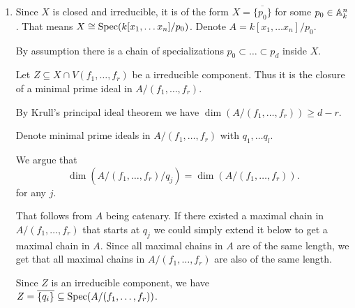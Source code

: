 \newcommand{\sheet}{10}




\maketitle{}

\begin{exercise}{1}
    \begin{enumerate}
        \item{
                Since $X$ is closed and irreducible, it is of the form $X =
                \overline{\{p_0\}}$ for some $p_0 \in \mathbb{A}^n_k$.
                That means $X \cong \operatorname{Spec}(k[x_1, \dots x_n] / p_0)$.
                Denote $A = k[x_1, \dots x_n] / p_0$.

                By assumption there is a chain of specializations $p_0 \subset
                \dots \subset p_d$ inside $X$.

                Let $Z \subseteq X \cap V(f_1, \dots, f_r)$ be a irreducible
                component. Thus it is the closure of a minimal prime ideal in $A
                / (f_1, \dots, f_r)$.

                By Krull's principal ideal theorem we have $\dim(A / (f_1,
                \dots, f_r)) \geq d - r$.

                Denote minimal prime ideals in $A / (f_1, \dots, f_r)$ with
                $q_1, \dots q_l$.
                
                We argue that
                \begin{equation*}
                    \dim(A / (f_1, \dots, f_r) / q_j) = \dim(A / (f_1, \dots, f_r)).
                \end{equation*}
                for any $j$.

                That follows from $A$ being catenary.
                If there existed a maximal chain in $A / (f_1, \dots, f_r)$ that
                starts at $q_j$ we could simply extend it below to get a
                maximal chain in $A$. Since all maximal chains in $A$ are of the
                same length, we get that all maximal chains in $A / (f_1, \dots,
                f_r)$ are also of the same length.

                Since $Z$ is an irreducible component, we have $Z =
                \overline{\{q_i\}} \subseteq \operatorname{Spec}(A / (f_1, \dots, f_r))$.

}
\end{enumerate}
\end{exercise}
